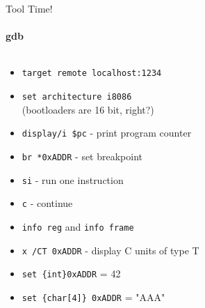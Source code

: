 \begin{frame}[t]{Tool Time!}
    \framesubtitle{gdb}
    \begin{columns}
        \begin{column}[t]{0.5\textwidth}
            \begin{itemize}
                \item<1-> \texttt{target remote localhost:1234}
                \item<1-> \texttt{set architecture i8086} \\
                    (bootloaders are 16 bit, right?)
                \item<1-> \texttt{display/i \$pc} - print program counter
                \item<1-> \texttt{br *0xADDR} - set breakpoint
                \item<1-> \texttt{si} - run one instruction
                \item<1-> \texttt{c} - continue
                \item<2-> \texttt{info reg} and \texttt{info frame}
                \item<3-|@uncover> \texttt{x /CT 0xADDR} - display C units of type T
                \item<3-|@uncover> \texttt{set \{int\}0xADDR} = 42
                \item<3-|@uncover> \texttt{set \{char[4]\} 0xADDR} = "AAA"
            \end{itemize}
        \end{column}
        \begin{column}[t]{0.5\textwidth}
        \end{column}
	\end{columns}
\end{frame}


